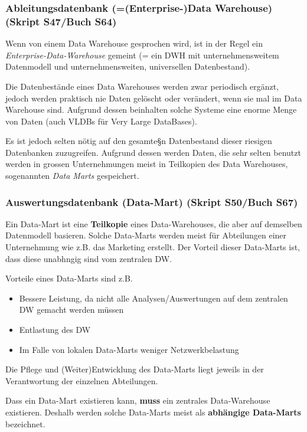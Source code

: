\documentclass[a4paper, 11pt, nofootinbib]{article}
\begin{document}
\subsubsection{Ableitungsdatenbank (=(Enterprise-)Data Warehouse) (Skript S47/Buch S64)}
Wenn von einem Data Warehouse gesprochen wird, ist in der Regel ein \textit{Enterprise-Data-Warehouse} gemeint (= ein DWH mit unternehmensweitem Datenmodell und unternehmensweiten, universellen Datenbestand). 

\vspace{10px}

\noindent Die Datenbestände eines Data Warehouses werden zwar periodisch ergänzt, jedoch werden praktisch nie Daten gelöscht oder verändert, wenn sie mal im Data Warehouse sind. Aufgrund dessen beinhalten solche Systeme eine enorme Menge von Daten (auch VLDBs für Very Large DataBases).

Es ist jedoch selten nötig auf den gesamte§n Datenbestand dieser riesigen Datenbanken zuzugreifen. Aufgrund dessen werden Daten, die sehr selten benutzt werden in grossen Unternehmungen meist in Teilkopien des Data Warehouses, sogenannten \textit{Data Marts} gespeichert.

\subsubsection{Auswertungsdatenbank (Data-Mart) (Skript S50/Buch S67)}
Ein Data-Mart ist eine \textbf{Teilkopie} eines Data-Warehouses, die aber auf demselben Datenmodell basieren. Solche Data-Marts werden meist für Abteilungen einer Unternehmung wie z.B. das Marketing erstellt. Der Vorteil dieser Data-Marts ist, dass diese unabhngig sind vom zentralen DW.

Vorteile eines Data-Marts sind z.B. 

\begin{itemize}
	\item Bessere Leistung, da nicht alle Analysen/Auswertungen auf dem zentralen DW gemacht werden müssen
	\item Entlastung des DW
	\item Im Falle von lokalen Data-Marts weniger Netzwerkbelastung
\end{itemize}

Die Pflege und (Weiter)Entwicklung des Data-Marts liegt jeweils in der Verantwortung der einzelnen Abteilungen.

\vspace{10px}

\noindent Dass ein Data-Mart existieren kann, \textbf{muss} ein zentrales Data-Warehouse existieren. Deshalb werden solche Data-Marts meist als \textbf{abhängige Data-Marts} bezeichnet.
\end{document}
